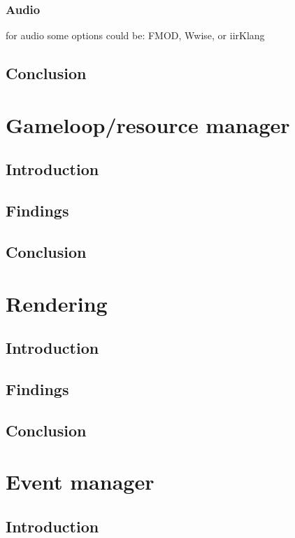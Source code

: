 \documentclass{projdoc}
\begin{document}
\subsubsection{Audio}

for audio some options could be: FMOD, Wwise, or iirKlang

\subsection{Conclusion}

\section{Gameloop/resource manager}

\subsection{Introduction}

\subsection{Findings}

\subsection{Conclusion}

\section{Rendering}

\subsection{Introduction}

\subsection{Findings}

\subsection{Conclusion}

\section{Event manager}

\subsection{Introduction}
\end{document}
